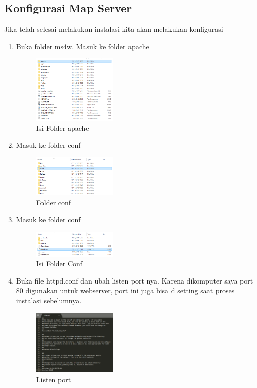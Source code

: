 \subsection{Konfigurasi Map Server}
Jika telah selesai melakukan instalasi kita akan melakukan konfigurasi
\begin{enumerate}
  \item Buka folder ms4w. Masuk ke folder apache
  \hfill\break
    \begin{figure}[H]
		\includegraphics[width=4cm]{figures/1174008/4/3.png}
		\centering
		\caption{Isi Folder apache}
    \end{figure}


  \item Masuk ke folder conf
  \hfill\break
    \begin{figure}[H]
		\includegraphics[width=4cm]{figures/1174008/4/4.png}
		\centering
		\caption{Folder conf}
    \end{figure}
  \item Masuk ke folder conf
  \hfill\break
    \begin{figure}[H]
		\includegraphics[width=4cm]{figures/1174008/4/5.png}
		\centering
		\caption{Isi Folder Conf}
    \end{figure}

  \item Buka file httpd.conf dan ubah listen port nya. Karena dikomputer saya port 80 digunakan untuk webserver, port ini juga bisa d setting saat proses instalasi sebelumnya.
  \hfill\break
    \begin{figure}[H]
		\includegraphics[width=4cm]{figures/1174008/4/6.png}
		\centering
		\caption{Listen port}
    \end{figure}


\end{enumerate}
